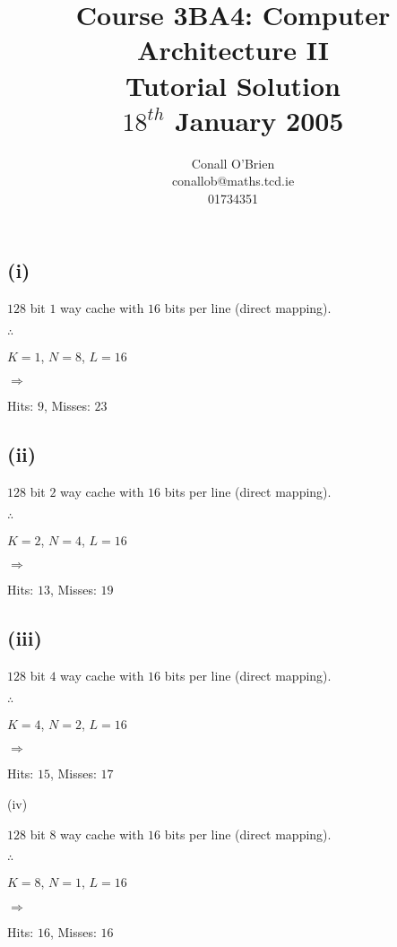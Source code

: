 \documentclass[a4paper,12pt]{article}
\begin{document}
\title{Course 3BA4: Computer Architecture II \\ Tutorial Solution\\$18^{th}$ January 2005}

\author{Conall O'Brien \\ conallob@maths.tcd.ie \\ 01734351}

\maketitle

\section{}

\subsection*{(i)}

$128$ bit $1$ way cache with $16$ bits per line (direct mapping).

$\therefore$

$K = 1$, $N = 8$, $L = 16$

$\Rightarrow$

Hits: $9$, Misses: $23$

\subsection*{(ii)}

$128$ bit $2$ way cache with $16$ bits per line (direct mapping).

$\therefore$

$K = 2$, $N = 4$, $L = 16$

$\Rightarrow$

Hits: $13$, Misses: $19$

\subsection*{(iii)}

$128$ bit $4$ way cache with $16$ bits per line (direct mapping).

$\therefore$

$K = 4$, $N = 2$, $L = 16$

$\Rightarrow$

Hits: $15$, Misses: $17$

(iv)

$128$ bit $8$ way cache with $16$ bits per line (direct mapping).

$\therefore$

$K = 8$, $N = 1$, $L = 16$

$\Rightarrow$

Hits: $16$, Misses: $16$

\section{}

\lstset{language=Python}


\end{document}
